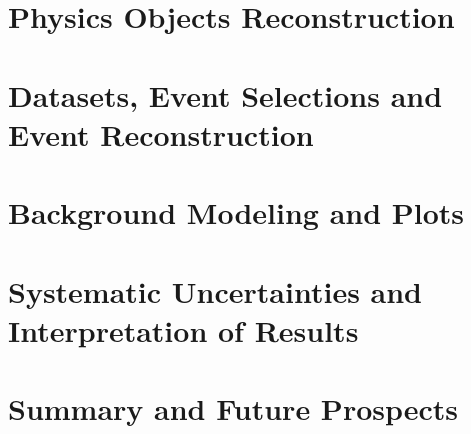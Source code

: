 \documentclass[14pt,a4paper,oldfontcommands]{memoir}
\begin{document}
\chapter{Physics Objects Reconstruction}

\chapter{Datasets, Event Selections and Event Reconstruction}


\chapter{Background Modeling and Plots}

\chapter{Systematic Uncertainties and Interpretation of Results}

\chapter{Summary and Future Prospects}





\end{document}
